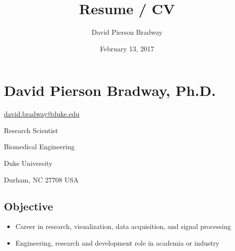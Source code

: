\documentclass[letterpaper,10pt,english]{sphinxmanual}
\title{Resume / CV}
\date{February 13, 2017}
\author{David Pierson Bradway}
\begin{document}
\maketitle
\tableofcontents
{}\label{index::doc}



\chapter{David Pierson Bradway, Ph.D.}
\label{resume:web-enhanced-resume-cv}\label{resume::doc}\label{resume:david-pierson-bradway-ph-d}
\begin{DUlineblock}{0em}
\item[] \href{mailto:david.bradway@duke.edu}{david.bradway@duke.edu}
\item[] Research Scientist
\item[] Biomedical Engineering
\item[] Duke University
\item[] Durham, NC 27708 USA
\end{DUlineblock}


\section{Objective}
\label{resume:objective}\begin{itemize}
\item {} 
Career in research, visualization, data acquisition, and signal
processing

\item {} 
Engineering, research and development role in academia or industry

\end{itemize}
\end{document}
